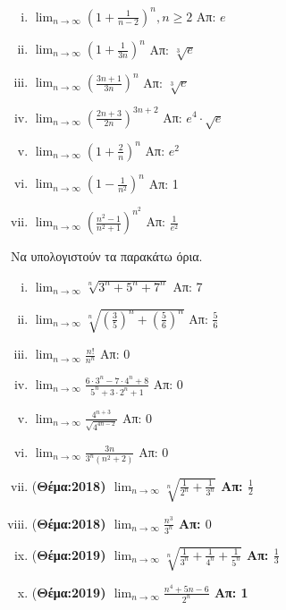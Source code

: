 \begin{enumerate}
        \begin{enumerate}[i)]
            \item $ \lim_{n \to \infty} \left(1+ \frac{1}{n-2}\right)^{n}, 
                n \geq 2 $ 
                \hfill Απ: $e$  
            \item $ \lim_{n \to \infty} \left(1 + \frac{1}{3n}\right)^{n} $ 
                \hfill Απ: $ \sqrt[3]{e} $ 
            \item $ \lim_{n \to \infty} (\frac{3n+1}{3n} )^{n} $ 
                \hfill Απ: $ \sqrt[3]{e}$ 
            \item $ \lim_{n \to \infty} \left(\frac{2n +3}{2n} 
                \right)^{3n+2}  $
                \hfill Απ: $ e^{4}\cdot \sqrt{e} $ 
            \item $ \lim_{n \to \infty} \left(1+ \frac{2}{n}\right)^{n} $ 
                \hfill Απ: $ e^{2} $ 
            \item $ \lim_{n \to \infty}\left(1-\frac{1}{n^{2}} \right)^{n} $ 
                \hfill Απ: 1 
            \item $ \lim_{n \to \infty} \left(\frac{n^{2}-1}{n^{2}+1} 
                \right)^{n^{2}} $
                \hfill Απ: $ \frac{1}{e^{2}} $ 
        \end{enumerate}
\end{enumerate}




Να υπολογιστούν τα παρακάτω όρια.

\begin{enumerate}[i)]
    \item $ \lim_{n \to \infty} \sqrt[n]{3^{n}+5^{n}+7^{n}}  $ \hfill Απ: 7 
    \item $ \lim_{n \to \infty} \sqrt[n]{\left(\frac{3}{5} \right)^{n} + 
        \left(\frac{5}{6} \right)^{n}} $ \hfill Απ: $ \frac{5}{6} $ 
    \item $ \lim_{n \to \infty} \frac{n!}{n^{n}} $ \hfill Απ: 0  
    \item $ \lim_{n \to \infty} \frac{6\cdot 3^{n}-7 \cdot 4^{n}+8}
        {5^{n}+3\cdot 2^{n}+1} $ \hfill Απ: 0  
    \item $ \lim_{n \to \infty} \frac{4^{n+3}}{\sqrt{4^{4n-2}}} $ \hfill Απ: 0  
    \item $ \lim_{n \to \infty} \frac{3n}{3^{n}(n^{2}+2)} $ \hfill Απ: 0  
    \item (\bfseries Θέμα:2018) $ \lim_{n \to \infty} \sqrt[n]{\frac{1}{2^{n}}+ 
        \frac{1}{3^{n}}} $ \hfill Απ: $ \frac{1}{2} $ 
    \item (\bfseries Θέμα:2018) $ \lim_{n \to \infty} \frac{n^{3}}{3^{n}} $ 
        \hfill Απ: $ 0 $
    \item (\bfseries Θέμα:2019) $ \lim_{n \to \infty} \sqrt[n]{\frac{1}{3^{n}} + 
        \frac{1}{4^{n}} + \frac{1}{5^{n}}} $ \hfill Απ: $ \frac{1}{3} $
    \item (\bfseries Θέμα:2019) $ \lim_{n \to \infty} \frac{n^{4}+5n-6}{2^{n}} $ 
        \hfill Απ: 1 
\end{enumerate}


